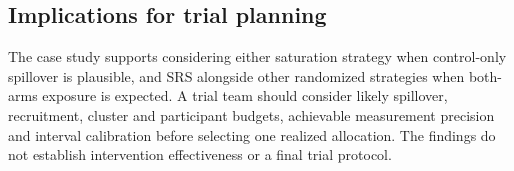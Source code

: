 \documentclass[11pt]{article}
\begin{document}
\iffullsi
\subsection{Implications for trial planning}\label{nc-planning-implications}


The case study supports considering either saturation strategy when
control-only spillover is plausible, and SRS alongside other randomized
strategies when both-arms exposure is expected. A trial team should
consider likely spillover, recruitment, cluster and participant budgets,
achievable measurement precision and interval calibration before
selecting one realized allocation. The findings do not establish
intervention effectiveness or a final trial protocol.
\fi

\FloatBarrier
\printbibliography[heading=bibliography,title={References}]
\end{document}
